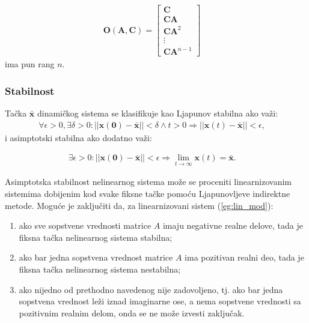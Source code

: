 \documentclass[a4paper,11pt]{article}
\theoremstyle{definition} \newtheorem{deff}{Definicija}[section]
\theoremstyle{definition} \newtheorem{prim}[deff]{Primer}
\theoremstyle{plain} \newtheorem{teor}[deff]{Teorema}
\newcommand{\vect}[1]{\boldsymbol{\mathbf{#1}}}
\begin{document}
	\begin{align}
		\vect{O}(\vect{A}, \vect{C}) = \begin{bmatrix}
			\vect{C} \\
			\vect{C}\vect{A} \\
			\vect{C}\vect{A}^2 \\
			\vdots \\
			\vect{C}\vect{A}^{n-1}
		\end{bmatrix} \quad
	\end{align}
	ima pun rang $n$. \\[16pt]
	
	\subsubsection{Stabilnost}
	
	
	
	Tačka \(\vect{\bar{x}}\) dinamičkog sistema se klasifikuje kao Ljapunov stabilna ako važi:
	\begin{align}
		\forall \epsilon > 0, \exists \delta > 0 : ||\vect{x(0)} - \vect{\bar{x}}|| < \delta \land t > 0 \Rightarrow ||\vect{x}(t) - \vect{\bar{x}}|| < \epsilon, \quad 
	\end{align}
	i asimptotski stabilna ako dodatno važi:
	
	\begin{align}
		\exists \epsilon > 0 : ||\vect{x(0)} - \vect{\bar{x}}|| < \epsilon \Rightarrow \lim_{t \to \infty} \vect{x}(t) = \vect{\bar{x}}. \quad
	\end{align}
	
	Asimptotska stabilnost nelinearnog sistema može se proceniti linearnizovanim sistemima dobijenim kod svake fiksne tačke pomoću Ljapunovljeve indirektne metode. Moguće je zaključiti da, za linearnizovani sistem (\ref{eg:lin_mod}):
	\begin{enumerate}
		\item ako sve sopstvene vrednosti matrice \(A\) imaju negativne realne delove, tada je fiksna tačka nelinearnog sistema stabilna;
		\item ako bar jedna sopstvena vrednost matrice \(A\) ima pozitivan realni deo, tada je fiksna tačka nelinearnog sistema nestabilna;
		\item ako nijedno od prethodno navedenog nije zadovoljeno, tj. ako bar jedna sopstvena vrednost leži iznad imaginarne ose, a nema sopstvene vrednosti sa pozitivnim realnim delom, onda se ne može izvesti zaključak.
	\end{enumerate} 
	
\end{document}
